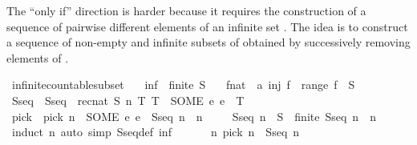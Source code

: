 \begin{isabellebody}
\begin{isamarkuptext}
  The ``only if'' direction is harder because it requires the
  construction of a sequence of pairwise different elements of an
  infinite set . The idea is to construct a sequence of
  non-empty and infinite subsets of  obtained by successively
  removing elements of .%
\end{isamarkuptext}\isamarkuptrue%
\isamarkupfalse%
\ infinite{\isacharunderscore}{\kern0pt}countable{\isacharunderscore}{\kern0pt}subset{\isacharcolon}{\kern0pt}\isanewline
\ \ \ inf{\isacharcolon}{\kern0pt}\ {\isachardoublequoteopen}{\isasymnot}\ finite\ S{\isachardoublequoteclose}\isanewline
\ \ \ {\isachardoublequoteopen}{\isasymexists}f{\isacharcolon}{\kern0pt}{\isacharcolon}{\kern0pt}nat\ {\isasymRightarrow}\ {\isacharprime}{\kern0pt}a{\isachardot}{\kern0pt}\ inj\ f\ {\isasymand}\ range\ f\ {\isasymsubseteq}\ S{\isachardoublequoteclose}\isanewline
\ \ %
\isanewline
%
\isadelimproof
%
\endisadelimproof
%
\isatagproof
{}\isamarkupfalse%
\ {\isacharminus}{\kern0pt}\isanewline
\ \ \isamarkupfalse%
\ Sseq\ \ {\isachardoublequoteopen}Sseq\ {\isacharequal}{\kern0pt}\ rec{\isacharunderscore}{\kern0pt}nat\ S\ {\isacharparenleft}{\kern0pt}{\isasymlambda}n\ T{\isachardot}{\kern0pt}\ T\ {\isacharminus}{\kern0pt}\ {\isacharbraceleft}{\kern0pt}SOME\ e{\isachardot}{\kern0pt}\ e\ {\isasymin}\ T{\isacharbraceright}{\kern0pt}{\isacharparenright}{\kern0pt}{\isachardoublequoteclose}\isanewline
\ \ \isamarkupfalse%
\ pick\ \ {\isachardoublequoteopen}pick\ n\ {\isacharequal}{\kern0pt}\ {\isacharparenleft}{\kern0pt}SOME\ e{\isachardot}{\kern0pt}\ e\ {\isasymin}\ Sseq\ n{\isacharparenright}{\kern0pt}{\isachardoublequoteclose}\ \ n\isanewline
\ \ \isamarkupfalse%
\ {\isacharasterisk}{\kern0pt}{\isacharcolon}{\kern0pt}\ {\isachardoublequoteopen}Sseq\ n\ {\isasymsubseteq}\ S{\isachardoublequoteclose}\ {\isachardoublequoteopen}{\isasymnot}\ finite\ {\isacharparenleft}{\kern0pt}Sseq\ n{\isacharparenright}{\kern0pt}{\isachardoublequoteclose}\ \ n\isanewline
\ \ \ \ \isamarkupfalse%
\ {\isacharparenleft}{\kern0pt}induct\ n{\isacharparenright}{\kern0pt}\ {\isacharparenleft}{\kern0pt}auto\ simp{\isacharcolon}{\kern0pt}\ Sseq{\isacharunderscore}{\kern0pt}def\ inf{\isacharparenright}{\kern0pt}\isanewline
\ \ \isamarkupfalse%
\ \isamarkupfalse%
\ {\isacharasterisk}{\kern0pt}{\isacharasterisk}{\kern0pt}{\isacharcolon}{\kern0pt}\ {\isachardoublequoteopen}{\isasymAnd}n{\isachardot}{\kern0pt}\ pick\ n\ {\isasymin}\ Sseq\ n{\isachardoublequoteclose}\isanewline

\end{isabellebody}
